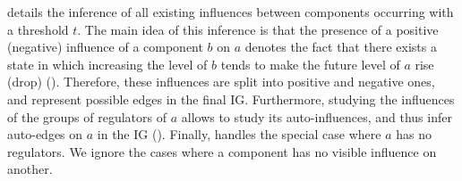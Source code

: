  details the inference of all existing influences between components occurring
with a threshold $t$.
The main idea of this inference is that
the presence of a positive (negative) influence of a component $b$ on $a$ denotes the fact that
there exists a state in which increasing the level of $b$ tends to make the future level of $a$ rise (drop)
().
Therefore, these influences are split into positive and negative ones, and represent possible edges in the final IG.
Furthermore, studying the influences of the groups of regulators of $a$
allows to study its auto-influences, and thus infer auto-edges on $a$ in the IG ().
Finally,  handles the special case where $a$ has no regulators.
We ignore the cases where a component has no visible influence on another.
%
